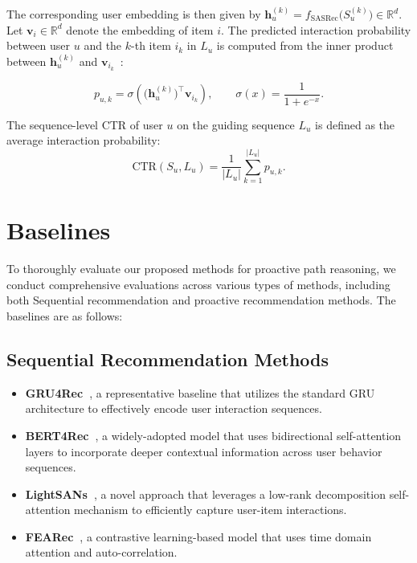 The corresponding user embedding is then given by $\mathbf{h}_u^{(k)} = f_{\mathrm{SASRec}}\bigl(S_u^{(k)}\bigr) \in \mathbb{R}^d.$ Let $\mathbf{v}_i \in \mathbb{R}^d$ denote the embedding of item $i$. The predicted interaction probability between user $u$ and the $k$-th item $i_k$ in $L_u$ is computed from the inner product between $\mathbf{h}_u^{(k)}$ and $\mathbf{v}_{i_k}$~\cite{bi2024proactive,lian2025itmprec}:

\begin{equation}
p_{u,k}
=
\sigma\!\left(
\bigl(\mathbf{h}_u^{(k)}\bigr)^\top \mathbf{v}_{i_k}
\right),
\qquad
\sigma(x) = \frac{1}{1 + e^{-x}}.
\end{equation}

The sequence-level CTR of user $u$ on the guiding sequence $L_u$
is defined as the average interaction probability:
\begin{equation}
\mathrm{CTR}(S_u, L_u)
=
\frac{1}{|L_u|}
\sum_{k=1}^{|L_u|}
p_{u,k}.
\end{equation}


\section{Baselines}
\label{app:baselines}

To thoroughly evaluate our proposed methods for proactive path reasoning, we conduct comprehensive evaluations across various types of methods, including both Sequential recommendation and proactive recommendation methods. The baselines are as follows:

\subsection{Sequential Recommendation Methods}

\begin{itemize}
    \item \textbf{GRU4Rec~\cite{hidasi2015session}}, a representative baseline that utilizes the standard GRU architecture to effectively encode user interaction sequences.
    \item \textbf{BERT4Rec~\cite{sun2019bert4rec}}, a widely-adopted model that uses bidirectional self-attention layers to incorporate deeper contextual information across user behavior sequences.
    \item \textbf{LightSANs~\cite{fan2021lighter}}, a novel approach that leverages a low-rank decomposition self-attention mechanism to efficiently capture user-item interactions.
    \item \textbf{FEARec~\cite{du2023frequency}}, a contrastive learning-based model that uses time domain attention and auto-correlation.
\end{itemize}

